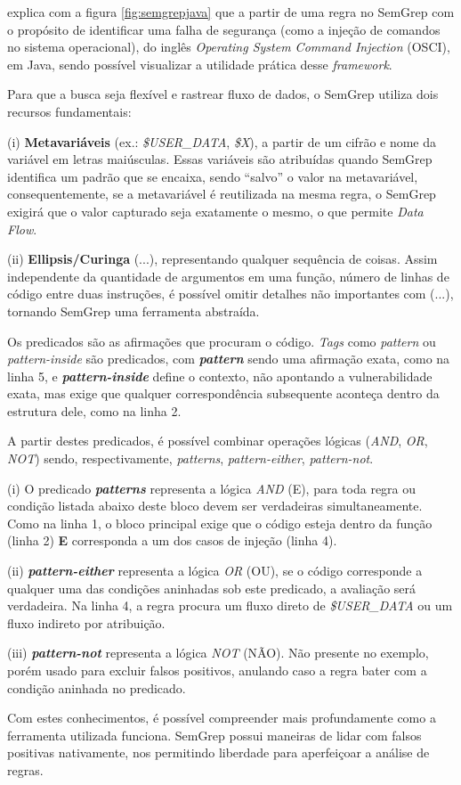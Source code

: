 \documentclass[
    12pt,                %
    openright,           %
    oneside,             %
    a4paper,             %
    english,             %
    brazil               %
]{abntex2}
\begin{document}
\begin{itemize}
\par
{} explica com a figura \ref{fig:semgrepjava} que a partir de uma regra no SemGrep com o propósito de identificar uma falha de segurança (como a injeção de comandos no sistema operacional), do inglês \textit{Operating System Command Injection} (OSCI), em Java, sendo possível visualizar a utilidade prática desse \textit{framework}.
\par
Para que a busca seja flexível e rastrear fluxo de dados, o SemGrep utiliza dois recursos fundamentais: 
\par
(i) \textbf{Metavariáveis} (ex.: \textit{\$USER\_DATA}, \textit{\$X}), a partir de um cifrão e nome da variável em letras maiúsculas.
Essas variáveis são atribuídas quando SemGrep identifica um padrão que se encaixa, sendo ``salvo'' o valor na metavariável, consequentemente, se a metavariável é reutilizada na mesma regra, o SemGrep exigirá que o valor capturado seja exatamente o mesmo, o que permite \textit{Data Flow}.
\par
(ii) \textbf{Ellipsis/Curinga} (...), representando qualquer sequência de coisas.
Assim independente da quantidade de argumentos em uma função, número de linhas de código entre duas instruções, é possível omitir detalhes não importantes com (...), tornando SemGrep uma ferramenta abstraída.
\par
Os predicados são as afirmações que procuram o código.
\textit{Tags} como \textit{pattern} ou \textit{pattern-inside} são predicados, com \textit{\textbf{pattern}} sendo uma afirmação exata, como na linha 5, e \textit{\textbf{pattern-inside}} define o contexto, não apontando a vulnerabilidade exata, mas exige que qualquer correspondência subsequente aconteça dentro da estrutura dele, como na linha 2.
\par
A partir destes predicados, é possível combinar operações lógicas (\textit{AND}, \textit{OR}, \textit{NOT}) sendo, respectivamente, \textit{patterns}, \textit{pattern-either}, \textit{pattern-not}.
\par
(i) O predicado \textit{\textbf{patterns}} representa a lógica \textit{AND} (E), para toda regra ou condição listada abaixo deste bloco devem ser verdadeiras simultaneamente.
Como na linha 1, o bloco principal exige que o código esteja dentro da função (linha 2) \textbf{E} corresponda a um dos casos de injeção (linha 4).
\par
(ii) \textbf{\textit{pattern-either}} representa a lógica \textit{OR} (OU), se o código corresponde a qualquer uma das condições aninhadas sob este predicado, a avaliação será verdadeira. Na linha 4, a regra procura um fluxo direto de \textit{\$USER\_DATA} ou um fluxo indireto por atribuição.
\par
(iii) \textbf{\textit{pattern-not}} representa a lógica \textit{NOT} (NÃO).
Não presente no exemplo, porém usado para excluir falsos positivos, anulando caso a regra bater com a condição aninhada no predicado.
\par
Com estes conhecimentos, é possível compreender mais profundamente como a ferramenta utilizada funciona. SemGrep possui maneiras de lidar com falsos positivas nativamente, nos permitindo liberdade para aperfeiçoar a análise de regras.


\end{itemize}
\end{document}
